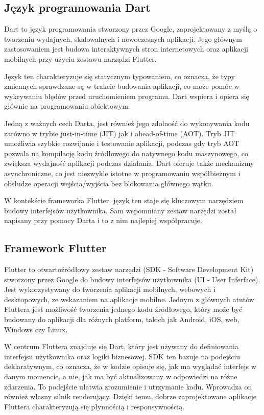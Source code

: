 \documentclass[12pt,twoside,draft]{article}
\begin{document}
\subsection{Język programowania Dart}
Dart to język programowania stworzony przez Google, zaprojektowany z myślą o tworzeniu wydajnych, skalowalnych i nowoczesnych aplikacji. Jego głównym zastosowaniem jest budowa interaktywnych stron internetowych oraz aplikacji mobilnych przy użyciu zestawu narządzi Flutter.

Język ten charakteryzuje się statycznym typowaniem, co oznacza, że typy zmiennych sprawdzane są w trakcie budowania aplikacji, co może pomóc w wykrywaniu błędów przed uruchomieniem programu. Dart wspiera i opiera się głównie na programowaniu obiektowym.

Jedną z ważnych cech Darta, jest również jego zdolność do wykonywania kodu zarówno w trybie just-in-time (JIT) jak i ahead-of-time (AOT). Tryb JIT umożliwia szybkie rozwijanie i testowanie aplikacji, podczas gdy tryb AOT pozwala na kompilację
kodu źródłowego do natywnego kodu maszynowego, co zwiększa wydajność aplikacji podczas działania. Dart oferuje także mechanizmy asynchroniczne, co jest niezwykle istotne w programowaniu współbieżnym i obsłudze operacji wejścia/wyjścia bez blokowania głównego wątku.\cite{dartInfo}

W kontekście frameworka Flutter, język ten staje się kluczowym narzędziem budowy interfejsów użytkownika. Sam wspomniany zestaw narzędzi został napisany przy pomocy Darta i to z nim najlepiej współpracuje.
\subsection{Framework Flutter}
Flutter to otwartoźródłowy zestaw narzędzi (SDK - Software Development Kit) stworzony przez Google do budowy interfejsów użytkownika (UI - User Inferface). Jest wykorzystywany do tworzenia aplikacji mobilnych, webowych i desktopowych, ze wskazaniem na aplikacje mobilne. Jednym z głównych atutów Fluttera jest możliwość tworzenia jednego kodu źródłowego, który może być budowany do aplikacji dla różnych platform, takich jak Android, iOS, web, Windows czy Linux.

W centrum Fluttera znajduje się Dart, który jest używany do definiowania interfejsu użytkownika oraz logiki biznesowej.
SDK ten bazuje na podejściu deklaratywnym, co oznacza, że w kodzie opisuje się, jak ma wyglądać interfejs w danym momencie, a nie, jak ma być aktualizowany w odpowiedzi na różne zdarzenia. To podejście ułatwia zrozumienie i utrzymanie kodu.
Wprowadza on również własny silnik renderujący. Dzięki temu, dobrze zaprojektowane aplikacje Fluttera charakteryzują się płynnością i responsywnością.
\end{document}
